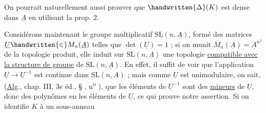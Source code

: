 On pourrait naturellement aussi prouver que $\handwritten{\Delta}(K)$ est dense dans $\underline{A}$ en utilisant la prop. 2.

Considérons maintenant le groupe multiplicatif $\mathrm{SL}(n,\underline{A})$, formé des matrices $\underline{U}\handwritten{\in}M_n(\underline{A})$ telles que $\det(\underline{U})=1$ ; si on munit $M_n(\underline{A})=\underline{A}^{n^2}$ de la topologie produit, elle induit sur $\mathrm{SL}(n,\underline{A})$ une topologie \uline{compatible avec la structure de groupe} de $\mathrm{SL}(n,\underline{A})$. En effet, il suffit de voir que l'application $\underline{U}\longrightarrow \underline{U}^{-1}$ est continue dans $\mathrm{SL}(n,\underline{A})$ ; mais comme $\underline{U}$ est unimodulaire, on sait, (\uline{Alg}., chap. III, 3e éd., § \hspace{1em}, n\textsuperscript{o} \hspace{1em}), que les éléments de $\underline{U}^{-1}$ sont des \uline{mineurs} de $\underline{U}$, donc des polynômes en les éléments de $\underline{U}$, ce qui prouve notre assertion. Si on identifie $K$ à un sous-anneau
